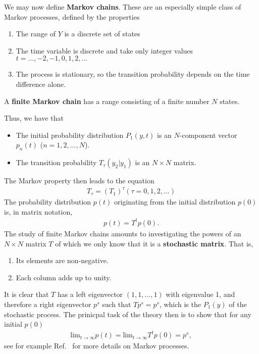 \documentclass[twoside,english]{uiofysmaster}
\begin{document}
We may now define \textbf{Markov chains}. These are an especially simple class of Markov processes, defined by the properties
\begin{enumerate}
	\item The range of $Y$ is a discrete set of states
	\item The time variable is discrete and take only integer values $t=...,-2,-1,0,1,2,...$
	\item The process is stationary, so the transition probability depends on the time difference alone.
\end{enumerate}
A \textbf{finite Markov chain} has a range consisting of a finite number $N$ states. 

Thus, we have that
\begin{itemize}
	\item The initial probability distribution $P_1 (y, t)$ is an $N$-component vector $p_n(t)$ ($n=1,2,...,N$).
	\item The transition probability $T_\tau (y_2|y_1)$ is an $N\times N$ matrix.
\end{itemize}

The Markov property then leads to the equation
\begin{align}
	T_\tau = (T_1)^{\tau} (\tau = 0,1,2,...)
\end{align}
The probability distribution $p(t)$ originating from the initial distribution $p(0)$ is, in matrix notation,
\begin{align}
	p(t) = T^t p(0).
\end{align}
The study of finite Markov chains amounts to investigating the powers of an $N\times N$ matrix $T$ of which we only know that it is a \textbf{stochastic matrix}. That is,
\begin{enumerate}
	\item Its elements are non-negative.
	\item Each column adds up to unity.
\end{enumerate}
It is clear that $T$ has a left eigenvector $(1,1,...,1)$ with eigenvalue 1, and therefore a right eigenvector $p^s$ such that $T p^s = p^s$, which is the $P_1(y)$ of the stochastic process.
The prinicpal task of the theory then is to show that for any initial $p(0)$
\begin{align}
	\text{lim}_{t\rightarrow \infty} p(t) = \text{lim}_{t\rightarrow \infty} T^t p(0) = p^s,
\end{align}
see for example Ref.~\cite{VanKampen2007} for more details on Markov processes.
\end{document}
